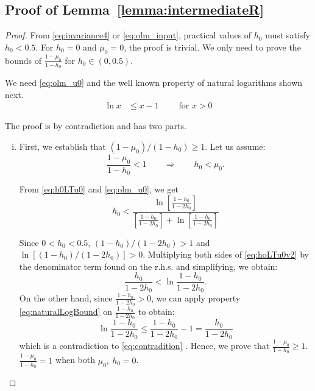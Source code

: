 \documentclass{IEEEtran}
\begin{document}
    \subsection*{Proof of Lemma~\ref{lemma:intermediateR}}
    \vspace{3mm}
     \begin{proof}
     From \eqref{eq:invariance4} or \eqref{eq:olm_input}, practical values of $h_0$ must satisfy $h_0 < 0.5$.  For $h_0=0$ and $\mu_0=0$, the proof is trivial. We only need to prove the bounds of $\frac{1-\mu_0}{1-h_0}$ for $h_0 \in(0, 0.5)$.

     We need \eqref{eq:olm_u0} and the well known property of natural logarithms shown next.
     \begin{align}
            \ln x &\leq x-1             \qquad      \mbox{ for $x >0$}    \label{eq:naturalLogBound}
     \end{align}

     The proof is by contradiction and has two parts.
     \begin{enumerate}[(i)]
     \item \label{p1} First, we establish that $(1-\mu_0)/(1-h_0)\geq 1$. Let us assume:
     \begin{equation}\label{eq:h0LTu0}
         \frac{1-\mu_0}{1-h_0} < 1 \qquad  \Rightarrow \qquad h_0 < \mu_0.
     \end{equation}

    From \eqref{eq:h0LTu0} and \eqref{eq:olm_u0}, we get
    \begin{equation}\label{eq:hoLTu0v2}
        h_0 < \frac{\ln[\frac{1-h_0}{1-2h_0} ]}{ [ \frac{1-h_0}{1-2h_0} ]+ \ln[\frac{1-h_0}{1-2h_0} ] }
    \end{equation}

    \newpage

     Since $0<h_0<0.5$, $(1-h_0)/(1-2h_0)>1$ and $\ln[(1-h_0)/(1-2h_0)]> 0$. Multiplying both sides of \eqref{eq:hoLTu0v2} by  the denominator term found on the r.h.s. and simplifying, we obtain:
     \begin{equation}\label{eq:contradition}
       \frac{h_0}{1-2h_0} < \ln\frac{1-h_0}{1-2h_0}.
     \end{equation}
     On the other hand, since $\frac{1-h_0}{1-2h_0}>0$, we can apply property \eqref{eq:naturalLogBound} on $\frac{1-h_0}{1-2h_0}$ to obtain:
     \begin{equation}
       \ln\frac{1-h_0}{1-2h_0} \leq \frac{1-h_0}{1-2h_0} -1 = \frac{h_0}{1-2h_0}
     \end{equation}
     which is a contradiction to \eqref{eq:contradition} .
    Hence, we prove that $\frac{1-\mu_0}{1-h_0}\geq 1$. $\frac{1-\mu_0}{1-h_0}= 1$ when both $\mu_0,~h_0=0$.


\end{enumerate}
\end{proof}
\end{document}
